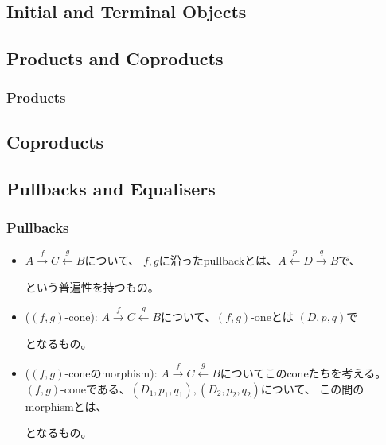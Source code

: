 \documentclass[9pt]{ltjsarticle}
\begin{document}
\subsection{Initial and Terminal Objects}
\label{sub:Initial and Terminal Objects}
\subsection{Products and Coproducts}
\label{sub:Products and Coproducts}
\subsubsection{Products}
\label{subs:Products}
\subsection{Coproducts}
\label{sub:Coproducts}
\subsection{Pullbacks and Equalisers}
\label{sub:Pullbacks and Equalisers}
\subsubsection{Pullbacks}
\label{subs:Pullbacks}
\begin{itemize}
  \item
  $A\xrightarrow{f} C \xleftarrow{g}B$について、
  $f,g$に沿ったpullbackとは、$A\xleftarrow{p}D \xrightarrow{q} B$で、
  \begin{quote}
  \end{quote}
  という普遍性を持つもの。
  \item
  ($(f,g)$-cone):
  $A\xrightarrow{f}C\xleftarrow{g} B$について、$(f,g)$-oneとは
  $(D,p,q)$で
  となるもの。
  \item
  ($(f,g)$-coneのmorphism):
  $A \xrightarrow{f} C \xleftarrow{g}B $についてこのconeたちを考える。
  $(f,g)$-coneである、$(D_1,p_1,q_1),(D_2,p_2,q_2)$について、
  この間のmorphismとは、
  となるもの。
\end{itemize}
\end{document}
